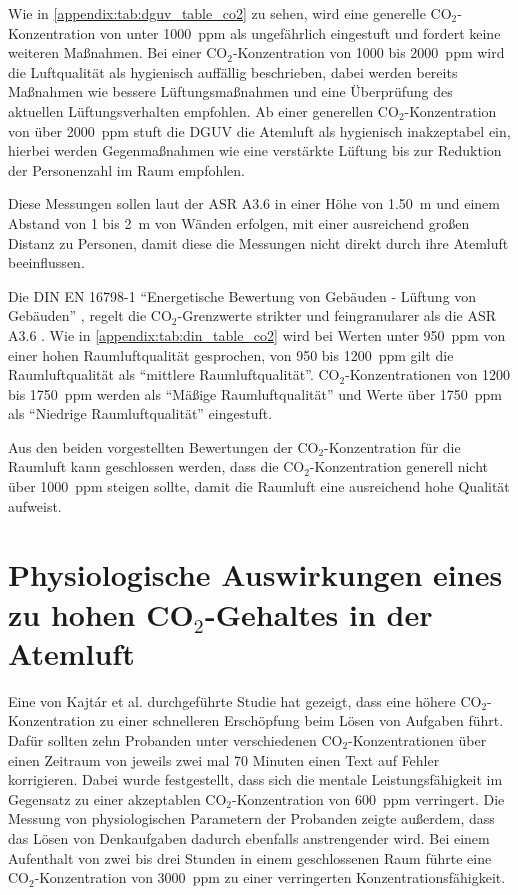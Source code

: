 \documentclass[a4paper,
    12pt,
    headings=small,
    ngerman,
    listof=totoc,
    numbers=noenddot]{scrreprt}[2021/11/13]
\begin{document}
Wie in \vref{appendix:tab:dguv_table_co2} zu sehen, wird eine generelle CO$_2$-Konzentration von unter \SI{1000}{\ac{ppm}} als ungefährlich eingestuft und fordert keine weiteren Maßnahmen. Bei einer CO$_2$-Konzentration von \si{1000} bis \SI{2000}{\ac{ppm}} wird die Luftqualität als hygienisch auffällig beschrieben, dabei werden bereits Maßnahmen wie bessere Lüftungsmaßnahmen und eine Überprüfung des aktuellen Lüftungsverhalten empfohlen. Ab einer generellen CO$_2$-Konzentration von über \SI{2000}{\ac{ppm}} stuft die \ac{DGUV} die Atemluft als hygienisch inakzeptabel ein, hierbei werden
Gegenmaßnahmen wie eine verstärkte Lüftung bis zur Reduktion der Personenzahl im Raum empfohlen.

Diese Messungen sollen laut der \ac{ASR} A3.6 \autocite{ASR} in einer Höhe von \SI{1.50}{\metre} und einem Abstand von \si{1} bis \SI{2}{\metre} von Wänden erfolgen, mit einer ausreichend großen Distanz zu Personen, damit diese die Messungen nicht direkt durch ihre Atemluft beeinflussen.

Die DIN EN 16798-1 \autocite{din_en_16798} \enquote{Energetische Bewertung von Gebäuden - Lüftung von Gebäuden} \autocite{din_en_16798}, regelt die CO$_2$-Grenzwerte strikter und feingranularer als die \ac{ASR} A3.6 \autocite{ASR}. Wie in \vref{appendix:tab:din_table_co2} wird bei Werten unter \SI{950}{\ac{ppm}} von einer hohen Raumluftqualität gesprochen, von \si{950} bis \SI{1200}{\ac{ppm}} gilt die Raumluftqualität als \enquote{mittlere Raumluftqualität}. CO$_2$-Konzentrationen von \si{1200} bis \SI{1750}{\ac{ppm}} werden als \enquote{Mäßige Raumluftqualität} und Werte über \SI{1750}{\ac{ppm}} als \enquote{Niedrige Raumluftqualität} eingestuft.

Aus den beiden vorgestellten Bewertungen der CO$_2$-Konzentration für die Raumluft kann geschlossen werden, dass die CO$_2$-Konzentration generell nicht über \SI{1000}{\ac{ppm}} steigen sollte, damit die Raumluft eine ausreichend hohe Qualität aufweist.


\section{Physiologische Auswirkungen eines zu hohen CO\texorpdfstring{$_2$}{TEXT}-Gehaltes in der Atemluft}

Eine von Kajtár et al. \autocite{kajtar} durchgeführte Studie hat gezeigt, dass eine höhere CO$_2$-Konzentration zu einer schnelleren Erschöpfung beim Lösen von Aufgaben führt. Dafür sollten zehn Probanden unter verschiedenen CO$_2$-Konzentrationen über einen Zeitraum von jeweils zwei mal 70 Minuten einen Text auf Fehler korrigieren. Dabei wurde festgestellt, dass sich die mentale Leistungsfähigkeit im Gegensatz zu einer akzeptablen CO$_2$-Konzentration von \SI{600}{\ac{ppm}} verringert. Die Messung von physiologischen Parametern der Probanden zeigte außerdem, dass das Lösen von Denkaufgaben dadurch ebenfalls anstrengender wird. Bei einem Aufenthalt von zwei bis drei Stunden in einem geschlossenen Raum führte eine CO$_2$-Konzentration von \SI{3000}{\ac{ppm}} zu einer verringerten Konzentrationsfähigkeit.
\end{document}
